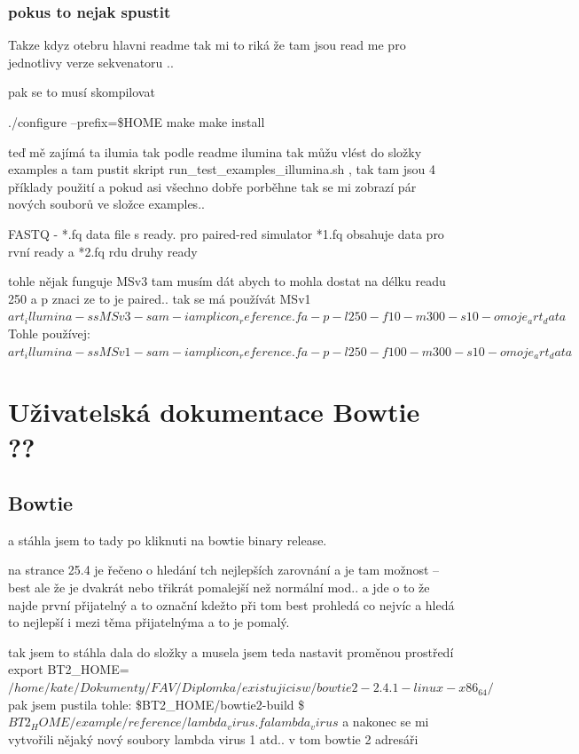 \documentclass[czech,DP]{thesiskiv}
\numberwithin{equation}{section}
\begin{document}
\subsection{pokus to nejak spustit}
Takze kdyz otebru hlavni readme tak mi to riká že tam jsou read me pro jednotlivy verze sekvenatoru ..

pak se to musí skompilovat 

./configure --prefix=\$HOME
	       	make
	       	make install	 
	 
teď mě zajímá ta ilumia tak podle readme ilumina tak můžu vlést do složky examples a tam pustit skript run\_test\_examples\_illumina.sh , tak tam jsou 4 příklady použití 
a pokud asi všechno dobře porběhne tak se mi zobrazí pár nových souborů ve složce examples.. 

FASTQ - *.fq data file s ready. pro paired-red simulator
*1.fq obsahuje data pro rvní ready a *2.fq rdu druhy ready

tohle nějak funguje
MSv3 tam musím dát abych to mohla dostat na délku readu 250 a p znaci ze to je paired.. 
tak se má používát MSv1
$art_illumina -ss MSv3 -sam -i amplicon_reference.fa -p -l 250 -f 10 -m 300 -s 10 -o moje_art_data$
Tohle používej:
$art_illumina -ss MSv1 -sam -i amplicon_reference.fa -p -l 250 -f 100 -m 300 -s 10 -o moje_art_data$

\chapter{Uživatelská dokumentace Bowtie ??}
\section{Bowtie}
 a stáhla jsem to tady %
 po kliknuti na bowtie binary release.

na strance 25.4 je řečeno o hledání tch nejlepších zarovnání a je tam možnost --best ale že je dvakrát nebo třikrát pomalejší než normální mod.. a jde o to že najde první přijatelný a to označní kdežto při tom best prohledá co nejvíc a hledá to nejlepší i mezi těma přijatelnýma a to je pomalý.


tak jsem  to stáhla dala do složky a musela jsem teda nastavit proměnou prostředí 
export BT2\_HOME=$/home/kate/Dokumenty/FAV/Diplomka/existujicisw/bowtie2-2.4.1-linux-x86_64/$
pak jsem pustila tohle: 
\$BT2\_HOME/bowtie2-build \$ $BT2_HOME/example/reference/lambda_virus.fa lambda_virus$
a nakonec se mi vytvořili nějaký nový soubory lambda virus 1 atd.. v tom bowtie 2 adresáři
\end{document}
